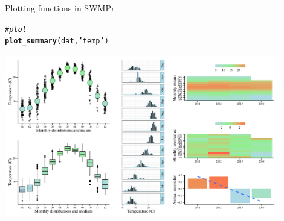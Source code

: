 \documentclass[xcolor=dvipsnames,serif]{beamer}\usepackage[]{graphicx}\usepackage[]{color}
\makeatletter
\newcommand{\hlstr}[1]{\textcolor[rgb]{0.192,0.494,0.8}{#1}}%
\newcommand{\hlcom}[1]{\textcolor[rgb]{0.678,0.584,0.686}{\textit{#1}}}%
\newcommand{\hlstd}[1]{\textcolor[rgb]{0.345,0.345,0.345}{#1}}%
\newcommand{\hlkwd}[1]{\textcolor[rgb]{0.737,0.353,0.396}{\textbf{#1}}}%
\newenvironment{kframe}{%
 \def\at@end@of@kframe{}%
 \ifinner\ifhmode%
  \def\at@end@of@kframe{\end{minipage}}%
  \begin{minipage}{\columnwidth}%
 \fi\fi%
 \def\FrameCommand##1{\hskip\@totalleftmargin \hskip-\fboxsep
 \colorbox{shadecolor}{##1}\hskip-\fboxsep
     \hskip-\linewidth \hskip-\@totalleftmargin \hskip\columnwidth}%
 \MakeFramed {\advance\hsize-\width
   \@totalleftmargin\z@ \linewidth\hsize
   \@setminipage}}%
 {\par\unskip\endMakeFramed%
 \at@end@of@kframe}
\newenvironment{knitrout}{}{} %
\makeatother
\begin{document}
\begin{frame}[fragile, t]{Plotting functions in SWMPr}

\begin{knitrout}\scriptsize
{}\color{fgcolor}\begin{kframe}
\begin{alltt}
\hlcom{# plot}
\hlkwd{plot_summary}\hlstd{(dat,} \hlstr{'temp'}\hlstd{)}
\end{alltt}
\end{kframe}

{\centering \includegraphics[width=0.9\textwidth]{figure/unnamed-chunk-32-1} 

}



\end{knitrout}
\end{frame}
\end{document}
